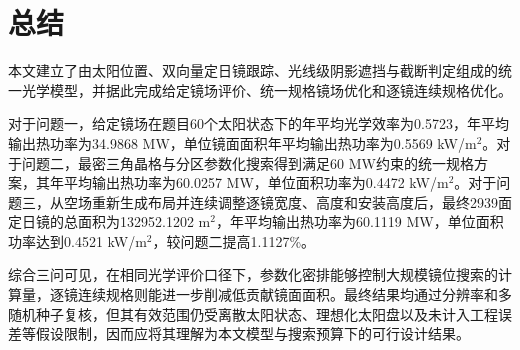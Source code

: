 \section{总结}

本文建立了由太阳位置、双向量定日镜跟踪、光线级阴影遮挡与截断判定组成的统一光学模型，并据此完成给定镜场评价、统一规格镜场优化和逐镜连续规格优化。

对于问题一，给定镜场在题目60个太阳状态下的年平均光学效率为0.5723，年平均输出热功率为34.9868 MW，单位镜面面积年平均输出热功率为0.5569 kW/m$^2$。对于问题二，最密三角晶格与分区参数化搜索得到满足60 MW约束的统一规格方案，其年平均输出热功率为60.0257 MW，单位面积功率为0.4472 kW/m$^2$。对于问题三，从空场重新生成布局并连续调整逐镜宽度、高度和安装高度后，最终2939面定日镜的总面积为132952.1202 m$^2$，年平均输出热功率为60.1119 MW，单位面积功率达到0.4521 kW/m$^2$，较问题二提高1.1127\%。

综合三问可见，在相同光学评价口径下，参数化密排能够控制大规模镜位搜索的计算量，逐镜连续规格则能进一步削减低贡献镜面面积。最终结果均通过分辨率和多随机种子复核，但其有效范围仍受离散太阳状态、理想化太阳盘以及未计入工程误差等假设限制，因而应将其理解为本文模型与搜索预算下的可行设计结果。
